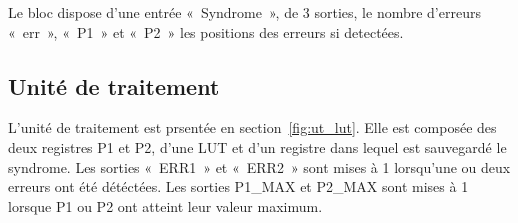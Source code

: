 \documentclass[a4paper, 11pt, svgnames]{report}
\begin{document}
            Le bloc dispose d'une entrée «~Syndrome~», de 3 sorties, le nombre
            d'erreurs «~err~», «~P1~» et «~P2~» les positions des erreurs si
            detectées.

            \subsection{Unité de traitement}
                L'unité de traitement est prsentée en section~\ref{fig:ut_lut}.
                Elle est composée des deux registres P1 et P2, d'une LUT et
                d'un registre dans lequel est sauvegardé le syndrome.  Les
                sorties «~ERR1~» et «~ERR2~» sont mises à 1 lorsqu'une ou deux
                erreurs ont été détéctées. Les sorties P1\_MAX et P2\_MAX sont
                mises à 1 lorsque P1 ou P2 ont atteint leur valeur maximum.
\end{document}
